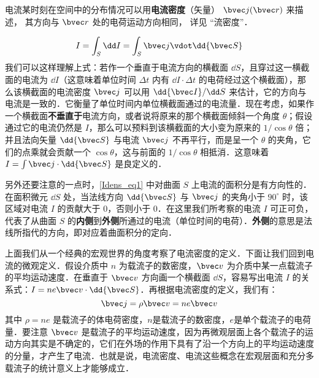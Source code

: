 

电流某时刻在空间中的分布情况可以用\textbf{电流密度}（矢量） $\bvec j(\bvec r)$ 来描述， 其方向与 $\bvec r$ 处的电荷运动方向相同， 详见 “流密度”．

\begin{equation}\label{Idens_eq1}
I = \int_S \dd I= \int_S \bvec j \vdot \dd{\bvec S}
\end{equation}
我们可以这样理解上式：若作一个垂直于电流方向的横截面 $\dd S$，且穿过这一横截面的电流为 $\dd I$（这意味着单位时间 $\Delta t$ 内有 $\dd I\cdot \Delta t$ 的电荷经过这个横截面），那么该横截面的电流密度 $\bvec j$ 可以用 $\dd{\bvec I}/\dd S$ 来估计，它的方向与电流是一致的．它衡量了单位时间内单位横截面通过的电流量．现在考虑，如果作一个横截面\textbf{不垂直于}电流方向，或者说将原来的那个横截面倾斜一个角度 $\theta$；假设通过它的电流仍然是 $I$，那么可以预料到该横截面的大小变为原来的 $1/\cos\theta$ 倍；并且法向矢量 $\dd{\bvec S}$ 与电流 $\bvec j$ 不再平行，而是呈一个 $\theta$ 的夹角，它们的点乘就会贡献一个 $\cos\theta$，这与前面的 $1/\cos\theta$ 相抵消．这意味着 $I=\int \bvec j\cdot \dd{\bvec S}$ 是良定义的．

另外还要注意的一点时，\autoref{Idens_eq1} 中对曲面 $S$ 上电流的面积分是有方向性的．在面积微元 $\dd S$ 处，当法线方向 $\dd{\bvec S}$ 与 $\bvec j$ 的夹角小于 $90^\circ$ 时，该区域对电流 $I$ 的贡献大于 $0$，否则小于 $0$．在这里我们所考察的电流 $I$ 可正可负，代表了从曲面 $S$ 的\textbf{内侧}到\textbf{外侧}所通过的电流（单位时间的电荷）．\textbf{外侧}的意思是法线所指代的方向，即对应着曲面积分的定向．

上面我们从一个经典的宏观世界的角度考察了电流密度的定义．下面让我们回到电流的微观定义．假设介质中 $n$ 为载流子的数密度，$\bvec v$ 为介质中某一点载流子的平均运动速度．在垂直于 $\bvec v$ 方向画一个横截面 $\dd S$，容易写出电流 $I$ 的关系式：$I=ne\bvec v \cdot \dd{\bvec S}$．再根据电流密度的定义，我们有：
\begin{equation}
\bvec j = \rho \bvec v = ne \bvec v
\end{equation}
其中 $\rho=ne$ 是载流子的体电荷密度，$n$是载流子的数密度，$e$是单个载流子的电荷量．要注意 $\bvec v$ 是载流子的平均运动速度，因为再微观层面上各个载流子的运动方向其实是不确定的，它们在外场的作用下具有了沿一个方向上的平均运动速度的分量，才产生了电流．也就是说，电流密度、电流这些概念在宏观层面和充分多载流子的统计意义上才能够成立\cite{GriffE}．
